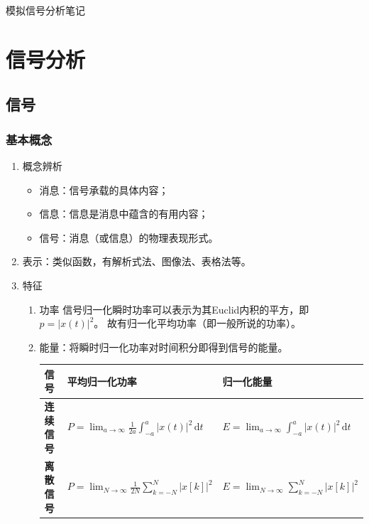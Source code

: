 \documentclass[UTF8,fontset=fandol,zihao=5]{ctexart}
\newcommand{\dd}{\,\mathrm{d}}
\begin{document}
\begin{center}
  {\heiti\headingfont{}\color{main} 模拟信号分析笔记}
\end{center}

\section{信号分析}

\subsection{信号}

\subsubsection{基本概念}

\begin{enumerate}
  
  \item 概念辨析
  \begin{itemize}
    \item 消息：信号承载的具体内容；
    \item 信息：信息是消息中蕴含的有用内容；
    \item 信号：消息（或信息）的物理表现形式。
  \end{itemize}

  \item 表示：类似函数，有解析式法、图像法、表格法等。

  \item 特征
  \begin{enumerate}[label=(\arabic*)]

    \item 功率
信号归一化瞬时功率可以表示为其Euclid内积的平方，即$p = \left | x(t) \right |^2$。
故有归一化平均功率（即一般所说的功率）。
    \item 能量：将瞬时归一化功率对时间积分即得到信号的能量。

\begin{center}
\begin{tabularx}{0.98\textwidth}{>{\bfseries}p{1.5cm}X X}
\toprule
信号 & 平均归一化功率 & 归一化能量 \\
\midrule
连续信号 & $P =\displaystyle \lim_{a \to \infty} \frac{1}{2a} \displaystyle\int_{-a}^{a} \left | x \left (t \right ) \right |^2 \dd t$ & $E = \displaystyle \lim_{a \to \infty} \displaystyle \int_{-a}^{a} \left | x \left (t \right ) \right |^2 \dd t$ \\
离散信号 & $P =\displaystyle \lim_{N \to \infty} \frac{1}{2N} \displaystyle\sum_{k=-N}^{N} \left | x \left [ k \right ] \right |^2$ & $E = \displaystyle \lim_{N \to \infty} \displaystyle \sum_{k=-N}^{N} \left | x \left [ k \right ] \right |^2$ \\
\bottomrule
\end{tabularx}
\end{center}

  \end{enumerate}
\end{enumerate}
\end{document}
